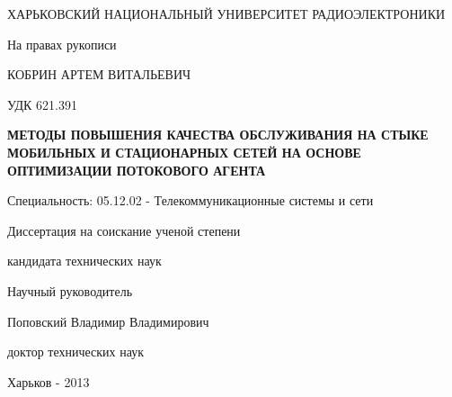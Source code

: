 \begin{titlepage}

 ХАРЬКОВСКИЙ НАЦИОНАЛЬНЫЙ УНИВЕРСИТЕТ РАДИОЭЛЕКТРОНИКИ

 \vspace*{3.5em plus .6em minus .5em}
\begin{flushright}
 На правах рукописи
\end{flushright}

 \vspace*{3.5em plus .6em minus .5em}
\MakeUppercase{Кобрин Артем Витальевич}

 \vspace*{1.5em plus .6em minus .5em}
\begin{flushright}
 УДК 621.391
\end{flushright}

 \vspace*{1.5em plus .6em minus .5em}
\MakeUppercase{\textbf{Методы повышения качества обслуживания на стыке мобильных и стационарных сетей на основе оптимизации 
потокового агента}}

 \vspace*{3.5em plus .6em minus .5em}
Специальность: 05.12.02 - Телекоммуникационные системы и сети
 \vspace*{3.5em plus .6em minus .5em}
 
 Диссертация на соискание ученой степени 
 
 кандидата технических наук

  \vspace*{3em plus .6em minus .5em}
\begin{flushleft}

\hangindent=8cm  \noindent
 Научный руководитель

 Поповский Владимир Владимирович

 доктор технических наук
 
 \vspace*{3em plus .6em minus .5em}
 


\end{flushleft}

 
  \vspace*{2em plus .6em minus .5em}
 Харьков - 2013
 
\end{titlepage}
